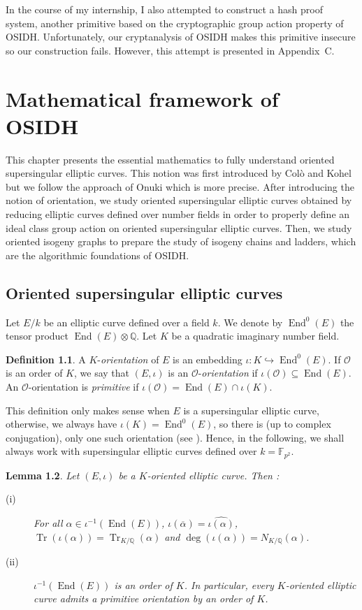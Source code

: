 \documentclass[a4paper,10pt,notitlepage]{report}
\theoremstyle{definition}
\newtheorem{Definition}{Definition}[chapter]
\theoremstyle{plain}
\newtheorem{Lemma}[Definition]{Lemma}
\theoremstyle{definition}
\newcommand{\Q}{\mathbb{Q}}
\newcommand{\F}{\mathbb{F}}
\newcommand{\mO}{\mathcal{O}}
\renewcommand{\(}{\left(}
\renewcommand{\)}{\right)}
\DeclareMathOperator{\End}{End}
\DeclareMathOperator{\Tr}{Tr}
\begin{document}
In the course of my internship, I also attempted to construct a hash proof system, another primitive based on the cryptographic group action property of OSIDH. Unfortunately, our cryptanalysis of OSIDH makes this primitive insecure so our construction fails. However, this attempt is presented in Appendix~C.

\chapter{Mathematical framework of OSIDH}

This chapter presents the essential mathematics to fully understand oriented supersingular elliptic curves. This notion was first introduced by Col\`{o} and Kohel \cite{OSIDH} but we follow the approach of Onuki \cite{Onuki} which is more precise. After introducing the notion of orientation, we study oriented supersingular elliptic curves obtained by reducing elliptic curves defined over number fields in order to properly define an ideal class group action on oriented supersingular elliptic curves. Then, we study oriented isogeny graphs to prepare the study of isogeny chains and ladders, which are the algorithmic foundations of OSIDH.

\section{Oriented supersingular elliptic curves}

Let $E/k$ be an elliptic curve defined over a field $k$.  We denote by $\End^0(E)$ the tensor product $\End(E)\otimes \Q$.  Let $K$ be a quadratic imaginary number field.

\begin{Definition}
A $K$-\emph{orientation} of $E$ is an embedding $\iota : K\hookrightarrow \End^0(E)$.  If $\mO$ is an order of $K$,  we say that $(E, \iota)$ is an $\mO$-\emph{orientation} if $\iota(\mO)\subseteq \End(E)$.  An $\mO$-orientation is \emph{primitive} if $\iota(\mO)=\End(E)\cap\iota(K)$.
\end{Definition}

This definition only makes sense when $E$ is a supersingular elliptic curve, otherwise, we always have $\iota(K)=\End^0(E)$, so there is (up to complex conjugation), only one such orientation (see \cite[Corollary III.9.4 and Theorem V.3.1]{Silverman1}). Hence, in the following, we shall always work with supersingular elliptic curves defined over $k=\F_{p^2}$.

\begin{Lemma}
Let $(E,\iota)$ be a $K$-oriented elliptic curve.  Then :
\begin{description}
\item[(i)] For all $\alpha\in\iota^{-1}(\End(E))$,  $\iota(\overline{\alpha})=\widehat{\iota(\alpha)}$,  $\Tr(\iota(\alpha))=\Tr_{K/\Q}(\alpha)$ and $\deg(\iota(\alpha))=N_{K/\Q}(\alpha)$.
\item[(ii)] $\iota^{-1}(\End(E))$ is an order of $K$.  In particular,  every $K$-oriented elliptic curve admits a primitive orientation by an order of $K$.
\end{description}
\end{Lemma}
\end{document}
